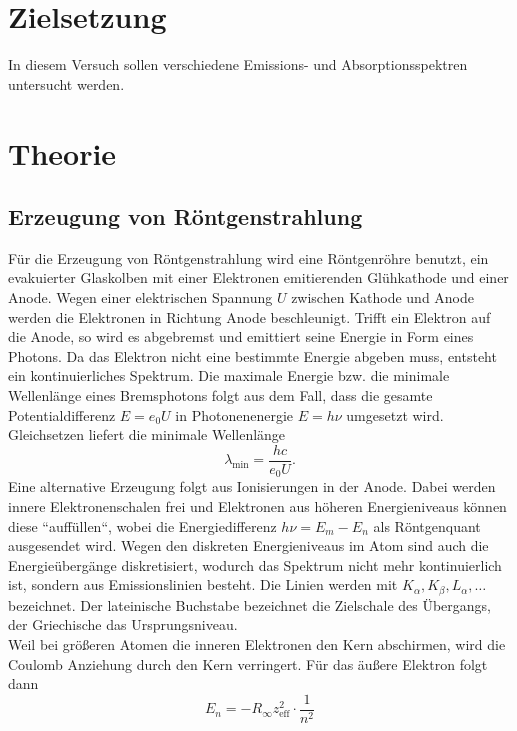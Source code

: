 \section*{Zielsetzung}
\label{sec:Zielsetzung}
In diesem Versuch sollen verschiedene Emissions- und Absorptionsspektren untersucht
werden.

\section{Theorie}
\label{sec:Theorie}
\subsection{Erzeugung von Röntgenstrahlung}
\label{sec:Erzeugung von Röntgenstrahlung}
Für die Erzeugung von Röntgenstrahlung wird eine Röntgenröhre benutzt, ein evakuierter
Glaskolben mit einer Elektronen emitierenden Glühkathode und einer Anode. Wegen einer
elektrischen Spannung $U$ zwischen Kathode und Anode werden die Elektronen in Richtung Anode
beschleunigt. Trifft ein Elektron auf die Anode, so wird es abgebremst und emittiert seine
Energie in Form eines Photons. Da das Elektron nicht eine bestimmte Energie abgeben muss,
entsteht ein kontinuierliches Spektrum. Die maximale Energie bzw. die minimale Wellenlänge
eines Bremsphotons folgt aus dem Fall, dass die gesamte Potentialdifferenz $E = e_0 U$ in
Photonenenergie $E = h\nu$ umgesetzt wird. Gleichsetzen liefert die minimale Wellenlänge
\begin{equation}
	\label{eqn:lambda_min}
	\lambda_\text{min} = \frac{hc}{e_0 U}.
\end{equation}
Eine alternative Erzeugung folgt aus Ionisierungen in der Anode. Dabei werden innere
Elektronenschalen frei und Elektronen aus höheren Energieniveaus können diese
``auffüllen``, wobei die Energiedifferenz $h\nu = E_m - E_n$ als Röntgenquant
ausgesendet wird. Wegen den diskreten Energieniveaus im Atom sind auch die
Energieübergänge diskretisiert, wodurch das Spektrum nicht mehr kontinuierlich ist,
sondern aus Emissionslinien besteht. Die Linien werden mit $K_\alpha, K_\beta, L_\alpha,
\hdots$ bezeichnet. Der lateinische Buchstabe bezeichnet die Zielschale des Übergangs, der
Griechische das Ursprungsniveau. 
\\
Weil bei größeren Atomen die inneren Elektronen den Kern abschirmen, wird die Coulomb
Anziehung durch den Kern verringert. Für das äußere Elektron folgt dann
\begin{equation}
	E_n = - R_\infty z_\text{eff}^2 \cdot \frac{1}{n^2}
\label{eqn:en}
\end{equation}
